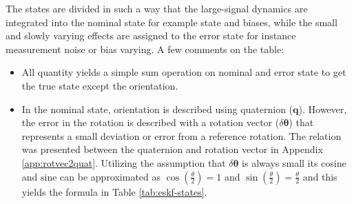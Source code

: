 The states are divided in such a way that the large-signal dynamics are integrated into the nominal state for example state and biases, while the small and slowly varying effects are assigned to the error state for instance measurement noise or bias varying. A few comments on the table:
\begin{itemize}
    \item 
    All quantity yields a simple sum operation on nominal and error state to get the true state except the orientation.
    \item
    In the nominal state, orientation is described using quaternion ($\mathbf{q}$). However, the error in the rotation is described with a rotation vector ($\delta\boldsymbol{\theta}$) that represents a small deviation or error from a reference rotation. The relation was presented between the quaternion and rotation vector in Appendix \ref{app:rotvec2quat}. Utilizing the assumption that $\delta\boldsymbol{\theta}$ is always small its cosine and sine can be approximated as $\cos\left(\frac{\theta}{2}\right)=1$ and $\sin\left(\frac{\theta}{2}\right)=\frac{\theta}{2}$ and this yields the formula in Table \ref{tab:eskf-states}.
    

\end{itemize}
